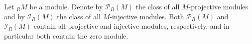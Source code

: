 Let ${}_R M$ be a module. Denote by $\mathcal{P}_R(M)$ the class of all $M$-projective modules and by $\mathcal{I}_R(M)$ the class of all $M$-injective modules. Both $\mathcal{P}_R(M)$ and $\mathcal{I}_R(M)$ contain all projective and injective modules, respectively, and in particular both contain the zero module.
